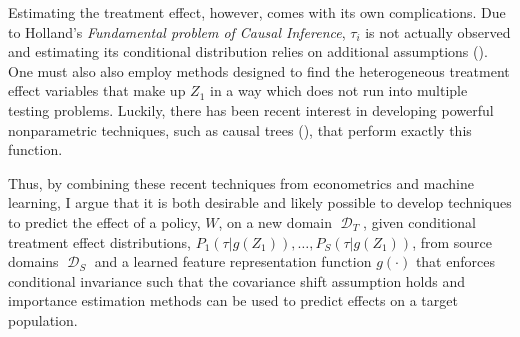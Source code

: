\documentclass[a4paper,12pt]{article}
\DeclareMathOperator*{\D}{\mathcal{D}}
\begin{document}
Estimating the treatment effect, however, comes with its own complications. Due to Holland's \parencite*{Holland1986} \textit{Fundamental problem of Causal Inference}, $\tau_i$ is not actually observed and estimating its conditional distribution relies on additional assumptions (\cite{Firpo2007}). One must also also employ methods designed to find the heterogeneous treatment effect variables that make up $Z_1$ in a way which does not run into multiple testing problems. Luckily, there has been recent interest in developing powerful nonparametric techniques, such as causal trees (\cite{Athey2016}), that perform exactly this function.

Thus, by combining these recent techniques from econometrics and machine learning, I argue that it is both desirable and likely possible to develop techniques to predict the effect of a policy, $W$, on a new domain $\D_T$, given conditional treatment effect distributions, $P_1(\tau | g(Z_1)),\ldots, P_S(\tau | g(Z_1))$, from source domains $\D_S$ and a learned feature representation function $g(\cdot)$ that enforces conditional invariance such that the covariance shift assumption holds and importance estimation methods can be used to predict effects on a target population. 






 



\end{document}

